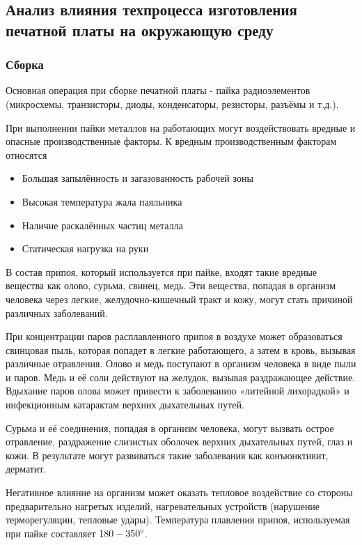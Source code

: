 \newpage

\subsection{Анализ влияния техпроцесса изготовления печатной платы на окружающую среду}

\subsubsection{Сборка}

Основная операция при сборке печатной платы - пайка радиоэлементов (микросхемы,
транзисторы, диоды, конденсаторы, резисторы, разъёмы и т.д.).

При выполнении пайки металлов на работающих могут воздействовать вредные и опасные
производственные факторы. К вредным производственным факторам относятся
\begin{itemize}
    \item Большая запылённость и загазованность рабочей зоны
    \item Высокая температура жала паяльника
    \item Наличие раскалённых частиц металла
    \item Статическая нагрузка на руки
\end{itemize}

В состав припоя, который используется при пайке, входят такие вредные вещества
как олово, сурьма, свинец, медь. Эти вещества, попадая в организм человека через
легкие, желудочно-кишечный тракт и кожу, могут стать причиной различных заболеваний.

При концентрации паров расплавленного припоя в воздухе может образоваться
свинцовая пыль, которая попадет в легкие работающего, а затем в кровь, вызывая
различные отравления. Олово и медь поступают в организм человека в виде пыли и
паров. Медь и её соли действуют на желудок, вызывая раздражающее действие.
Вдыхание паров олова может привести к заболеванию «литейной лихорадкой» и
инфекционным катарактам верхних дыхательных путей.

Сурьма и её соединения, попадая в организм человека, могут вызвать острое
отравление, раздражение слизистых оболочек верхних дыхательных путей, глаз и кожи.
В результате могут развиваться такие заболевания как конъюнктивит, дерматит.

Негативное влияние на организм может оказать тепловое воздействие со стороны
предварительно нагретых изделий, нагревательных устройств (нарушение терморегуляции,
тепловые удары). Температура плавления припоя, используемая при пайке составляет
$180 - 350 \degree$.

